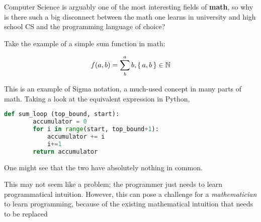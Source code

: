 \documentclass[../main.tex]{subfiles}
\begin{document}
Computer Science is arguably one of the most interesting fields of \textbf{math}, so why is there such a big disconnect between the math one learns in university and high school CS and the programming language of choice?

Take the example of a simple sum function in math:

\[ f(a, b) = \sum^a_{b} b , \set{a,b} \in \mathbb{N}  \]

This is an example of Sigma notation, a much-used concept in many parts of math. Taking a look at the equivalent expression in Python,

\begin{lstlisting}[language=python]
    def sum_loop (top_bound, start):
        accumulator = 0
        for i in range(start, top_bound+1):
            accumulator += i
            i+=1
        return accumulator
\end{lstlisting}

One might see that the two have absolutely nothing in common.

This may not seem like a problem; the programmer just needs to learn programmatical intuition. However, this can pose a challenge for a \textit{mathematician} to learn programming, because of the existing mathematical intuition that needs to be replaced
\end{document}
